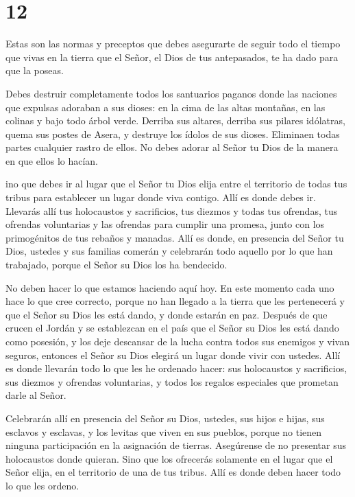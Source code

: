 \hypertarget{section-11}{%
\section{12}\label{section-11}}

 Estas son las normas y preceptos que debes asegurarte de
seguir todo el tiempo que vivas en la tierra que el Señor, el Dios de
tus antepasados, te ha dado para que la poseas.

 Debes destruir completamente todos los santuarios paganos
donde las naciones que expulsas adoraban a sus dioses: en la cima de las
altas montañas, en las colinas y bajo todo árbol verde. 
Derriba sus altares, derriba sus pilares idólatras, quema sus postes de
Asera, y destruye los ídolos de sus dioses. Eliminaen todas partes
cualquier rastro de ellos.  No debes adorar al Señor tu Dios
de la manera en que ellos lo hacían.

 ino que debes ir al lugar que el Señor tu Dios elija entre
el territorio de todas tus tribus para establecer un lugar donde viva
contigo. Allí es donde debes ir.  Llevarás allí tus
holocaustos y sacrificios, tus diezmos y todas tus ofrendas, tus
ofrendas voluntarias y las ofrendas para cumplir una promesa, junto con
los primogénitos de tus rebaños y manadas.  Allí es donde,
en presencia del Señor tu Dios, ustedes y sus familias comerán y
celebrarán todo aquello por lo que han trabajado, porque el Señor su
Dios los ha bendecido.

 No deben hacer lo que estamos haciendo aquí hoy. En este
momento cada uno hace lo que cree correcto,  porque no han
llegado a la tierra que les pertenecerá y que el Señor su Dios les está
dando, y donde estarán en paz.  Después de que crucen el
Jordán y se establezcan en el país que el Señor su Dios les está dando
como posesión, y los deje descansar de la lucha contra todos sus
enemigos y vivan seguros,  entonces el Señor su Dios
elegirá un lugar donde vivir con ustedes. Allí es donde llevarán todo lo
que les he ordenado hacer: sus holocaustos y sacrificios, sus diezmos y
ofrendas voluntarias, y todos los regalos especiales que prometan darle
al Señor.

 Celebrarán allí en presencia del Señor su Dios, ustedes,
sus hijos e hijas, sus esclavos y esclavas, y los levitas que viven en
sus pueblos, porque no tienen ninguna participación en la asignación de
tierras.  Asegúrense de no presentar sus holocaustos donde
quieran.  Sino que los ofrecerás solamente en el lugar que
el Señor elija, en el territorio de una de tus tribus. Allí es donde
deben hacer todo lo que les ordeno.

